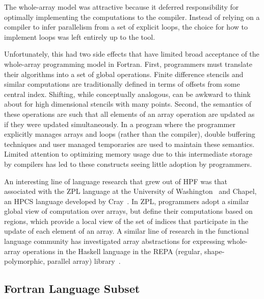 The whole-array model was attractive because it deferred
responsibility for optimally implementing the computations to the
compiler.  Instead of relying on a compiler to infer parallelism from
a set of explicit loops, the choice for how to implement loops was
left entirely up to the tool.

Unfortunately, this had two side effects that have limited broad
acceptance of the whole-array programming model in Fortran.  First,
programmers must translate their algorithms into a set of global
operations.  Finite difference stencils and similar computations are
traditionally defined in terms of offsets from some central index.
Shifting, while conceptually analogous, can be awkward to think about
for high dimensional stencils with many points.  Second, the semantics
of these operations are such that all elements of an array operation
are updated as if they were updated simultaneously.  In a program
where the programmer explicitly manages arrays and loops (rather than
the compiler), double buffering techniques and user managed
temporaries are used to maintain these semantics.  Limited attention
to optimizing memory usage due to this intermediate storage by
compilers has led to these constructs seeing little adoption by
programmers.


An interesting line of language research that grew out of HPF was that
associated with the ZPL language at the University of
Washington~\citep{chamberlain04zpl} and Chapel, an HPCS language developed by
Cray~\citep{chamberlainchapel}.  In ZPL, programmers adopt a similar global view
of computation over arrays, but define their computations based on regions,
which provide a local view of the set of indices that participate in the update
of each element of an array.  A similar line of research in the functional
language community has investigated array abstractions for expressing
whole-array operations in the Haskell language in the REPA (regular, shape-polymorphic,
parallel array) library~\citep{keller10repa}.

\subsection{Fortran Language Subset}

